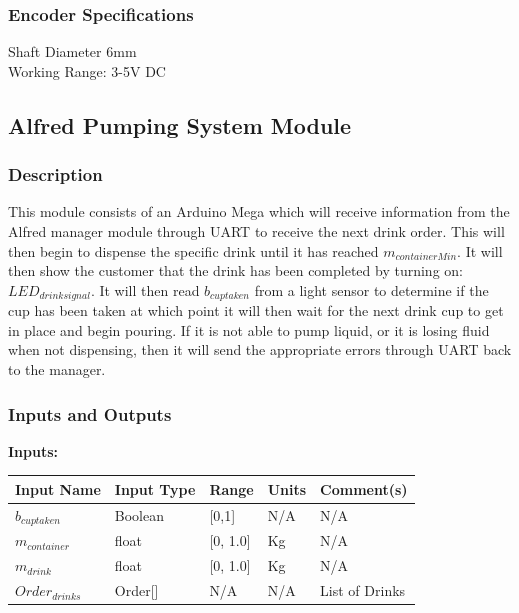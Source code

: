 \documentclass [10pt]{article}
\begin{document}

\subsubsection{Encoder Specifications}
Shaft Diameter 6mm\\
Working Range: 3-5V DC\\


\subsection{Alfred Pumping System Module}


\subsubsection{Description}
This module consists of an Arduino Mega which will receive information from the Alfred manager module through UART to receive the next drink order. This will then begin to dispense the specific drink until it has reached $ m_{containerMin} $. It will then show the customer that the drink has been completed by turning on: $ LED_{drinksignal} $. It will then read $ b_{cuptaken} $ from a light sensor to determine if the cup has been taken at which point it will then wait for the next drink cup to get in place and begin pouring. If it is not able to pump liquid, or it is losing fluid when not dispensing, then it will send the appropriate errors through UART back to the manager.


\subsubsection{Inputs and Outputs}

\textbf{Inputs: } \\

\begin{longtable}{|l|l|l|l|l|}\hline 
		\rowcolor{tableCell}\textbf{Input Name} & \textbf{Input Type} & \textbf{Range} & \textbf{Units} & \textbf{Comment(s)} \\ \hline
		$ b_{cuptaken } $ & Boolean & [0,1] & N/A &  N/A\\ \hline
		\rowcolor{tableCell}$ m_{container} $ & float & [0, 1.0]& Kg & N/A\\ \hline
		$ m_{drink} $    & float & [0, 1.0] & Kg &  N/A\\ \hline
		\rowcolor{tableCell}$ Order_{drinks} $ & Order[] & N/A  & N/A & List of Drinks  \\ \hline
\end{longtable}
\end{document}

